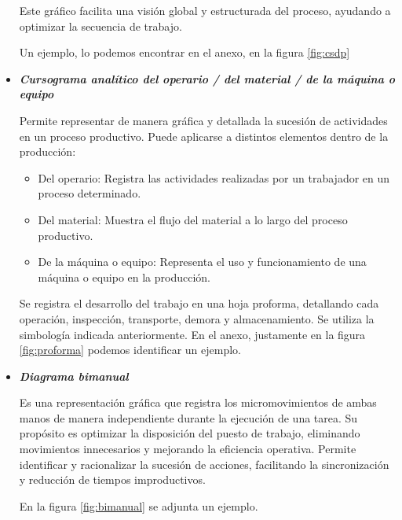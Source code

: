 \documentclass[a4paper,oneside,11pt]{article}
\begin{document}
\begin{itemize}
        Este gráfico facilita una visión global y estructurada del proceso, ayudando a optimizar la secuencia de trabajo.

        Un ejemplo, lo podemos encontrar en el anexo, en la figura \ref{fig:csdp}
        
    \item \textbf{\textit{Cursograma analítico del operario / del material / de la máquina o equipo}}
    
        Permite representar de manera gráfica y detallada la sucesión de actividades en un proceso productivo. Puede aplicarse a distintos elementos dentro de la producción:
        \begin{itemize}
            \item Del operario: Registra las actividades realizadas por un trabajador en un proceso determinado.
            \item Del material: Muestra el flujo del material a lo largo del proceso productivo.
            \item De la máquina o equipo: Representa el uso y funcionamiento de una máquina o equipo en la producción.
        \end{itemize}
        Se registra el desarrollo del trabajo en una hoja proforma, detallando cada operación, inspección, transporte, demora y almacenamiento. Se utiliza la simbología indicada anteriormente. En el anexo, justamente en la figura \ref{fig:proforma} podemos identificar un ejemplo.
    \item \textbf{\textit{Diagrama bimanual}}
    
        Es una representación gráfica que registra los micromovimientos de ambas manos de manera independiente durante la ejecución de una tarea. Su propósito es optimizar la disposición del puesto de trabajo, eliminando movimientos innecesarios y mejorando la eficiencia operativa. Permite identificar y racionalizar la sucesión de acciones, facilitando la sincronización y reducción de tiempos improductivos.

        En la figura \ref{fig:bimanual} se adjunta un ejemplo. \label{ref:volver3}
    
\end{itemize}
\end{document}
